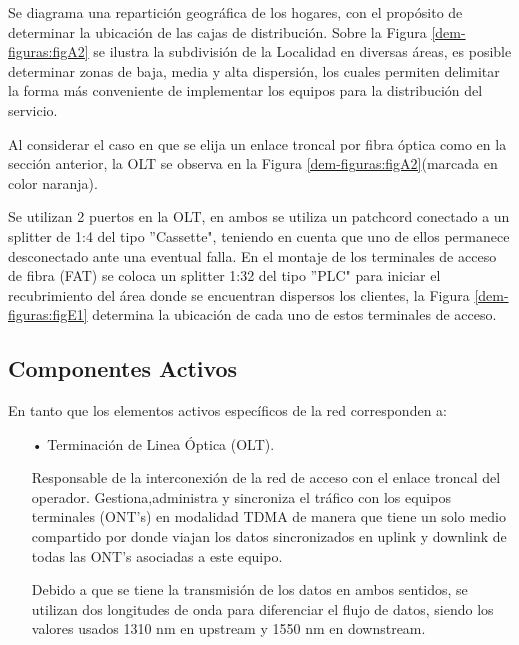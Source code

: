 \begin{enumerate}
Se diagrama una repartición geográfica de los hogares, con el propósito de determinar la ubicación de las cajas de distribución. Sobre la Figura \ref{dem-figuras:figA2} se ilustra la subdivisión de la Localidad en diversas áreas, es posible determinar zonas de baja, media y alta dispersión, los cuales permiten delimitar la forma más conveniente de implementar los equipos para la distribución del servicio.


Al considerar el caso en que se elija un enlace troncal por fibra óptica como en la sección anterior, la OLT se observa en la Figura \ref{dem-figuras:figA2}(marcada en color naranja). 




Se utilizan 2 puertos en la OLT, en ambos se utiliza un patchcord conectado a un splitter de 1:4 del tipo ''Cassette", teniendo en cuenta que uno de ellos permanece desconectado ante una eventual falla. En el montaje de los  terminales de acceso de fibra (FAT) se coloca un splitter 1:32 del tipo ''PLC"  para iniciar el recubrimiento del área donde se encuentran dispersos los clientes, la Figura \ref{dem-figuras:figE1} determina la ubicación de cada uno de estos terminales de acceso.









\subsection{Componentes Activos}
En tanto que los elementos activos específicos de la red corresponden a:
\begin{enumerate}
\item[•]Terminación de Linea Óptica (OLT).

Responsable de la interconexión de la red de acceso con el enlace troncal del operador. Gestiona,administra y sincroniza el tráfico con los equipos terminales (ONT's) en modalidad TDMA de manera que tiene un solo medio compartido por donde viajan los datos sincronizados en uplink y downlink de todas las ONT's asociadas a este equipo.

Debido a que se tiene la transmisión de los datos en ambos sentidos, se utilizan dos longitudes de onda para diferenciar el flujo de datos, siendo los valores usados 1310 nm en upstream y 1550 nm en downstream.





\end{enumerate}
\end{enumerate}
